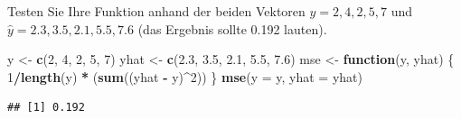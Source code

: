 \documentclass[12pt,a4paper]{article}
\newenvironment{Shaded}{\begin{snugshade}}{\end{snugshade}}
\newcommand{\AttributeTok}[1]{\textcolor[rgb]{0.13,0.29,0.53}{#1}}
\newcommand{\ControlFlowTok}[1]{\textcolor[rgb]{0.13,0.29,0.53}{\textbf{#1}}}
\newcommand{\DecValTok}[1]{\textcolor[rgb]{0.00,0.00,0.81}{#1}}
\newcommand{\FloatTok}[1]{\textcolor[rgb]{0.00,0.00,0.81}{#1}}
\newcommand{\FunctionTok}[1]{\textcolor[rgb]{0.13,0.29,0.53}{\textbf{#1}}}
\newcommand{\NormalTok}[1]{#1}
\newcommand{\OtherTok}[1]{\textcolor[rgb]{0.56,0.35,0.01}{#1}}
\newcommand{\SpecialCharTok}[1]{\textcolor[rgb]{0.81,0.36,0.00}{\textbf{#1}}}
\begin{document}
Testen Sie Ihre Funktion anhand der beiden Vektoren
\(y = {2, 4, 2, 5, 7}\) und \(\hat{y}= {2.3, 3.5, 2.1, 5.5, 7.6}\) (das
Ergebnis sollte 0.192 lauten).

\begin{Shaded}
\begin{Highlighting}[]
\NormalTok{    y    }\OtherTok{\textless{}{-}} \FunctionTok{c}\NormalTok{(}\DecValTok{2}\NormalTok{, }\DecValTok{4}\NormalTok{, }\DecValTok{2}\NormalTok{, }\DecValTok{5}\NormalTok{, }\DecValTok{7}\NormalTok{)}
\NormalTok{    yhat }\OtherTok{\textless{}{-}} \FunctionTok{c}\NormalTok{(}\FloatTok{2.3}\NormalTok{, }\FloatTok{3.5}\NormalTok{, }\FloatTok{2.1}\NormalTok{, }\FloatTok{5.5}\NormalTok{, }\FloatTok{7.6}\NormalTok{)}
\NormalTok{    mse }\OtherTok{\textless{}{-}} \ControlFlowTok{function}\NormalTok{(y, yhat) \{}
      \DecValTok{1}\SpecialCharTok{/}\FunctionTok{length}\NormalTok{(y) }\SpecialCharTok{*}\NormalTok{ (}\FunctionTok{sum}\NormalTok{((yhat }\SpecialCharTok{{-}}\NormalTok{ y)}\SpecialCharTok{\^{}}\DecValTok{2}\NormalTok{))}
\NormalTok{    \}}
    \FunctionTok{mse}\NormalTok{(}\AttributeTok{y =}\NormalTok{ y, }\AttributeTok{yhat =}\NormalTok{ yhat)}
\end{Highlighting}
\end{Shaded}

\begin{verbatim}
## [1] 0.192
\end{verbatim}
\end{document}
